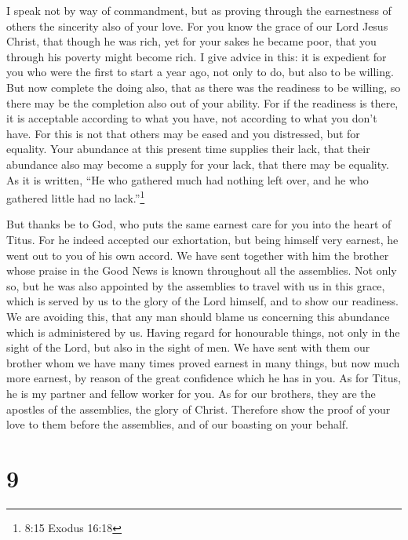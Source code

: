  I speak not by way of commandment, but as proving through
the earnestness of others the sincerity also of your love. 
For you know the grace of our Lord Jesus Christ, that though he was
rich, yet for your sakes he became poor, that you through his poverty
might become rich.  I give advice in this: it is expedient
for you who were the first to start a year ago, not only to do, but also
to be willing.  But now complete the doing also, that as
there was the readiness to be willing, so there may be the completion
also out of your ability.  For if the readiness is there,
it is acceptable according to what you have, not according to what you
don't have.  For this is not that others may be eased and
you distressed,  but for equality. Your abundance at this
present time supplies their lack, that their abundance also may become a
supply for your lack, that there may be equality.  As it is
written, ``He who gathered much had nothing left over, and he who
gathered little had no lack.''\footnote{8:15 Exodus 16:18}

 But thanks be to God, who puts the same earnest care for
you into the heart of Titus.  For he indeed accepted our
exhortation, but being himself very earnest, he went out to you of his
own accord.  We have sent together with him the brother
whose praise in the Good News is known throughout all the assemblies.
 Not only so, but he was also appointed by the assemblies
to travel with us in this grace, which is served by us to the glory of
the Lord himself, and to show our readiness.  We are
avoiding this, that any man should blame us concerning this abundance
which is administered by us.  Having regard for honourable
things, not only in the sight of the Lord, but also in the sight of men.
 We have sent with them our brother whom we have many times
proved earnest in many things, but now much more earnest, by reason of
the great confidence which he has in you.  As for Titus, he
is my partner and fellow worker for you. As for our brothers, they are
the apostles of the assemblies, the glory of Christ. 
Therefore show the proof of your love to them before the assemblies, and
of our boasting on your behalf.

\hypertarget{section-8}{%
\section{9}\label{section-8}}

